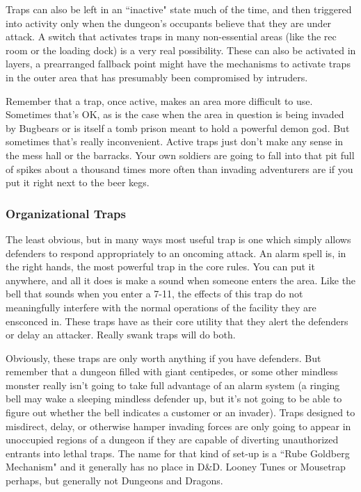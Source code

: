 Traps can also be left in an ``inactive" state much of the time, and then triggered into activity only when the dungeon's occupants believe that they are under attack. A switch that activates traps in many non-essential areas (like the rec room or the loading dock) is a very real possibility. These can also be activated in layers, a prearranged fallback point might have the mechanisms to activate traps in the outer area that has presumably been compromised by intruders.

Remember that a trap, once active, makes an area more difficult to use. Sometimes that's OK, as is the case when the area in question is being invaded by Bugbears or is itself a tomb prison meant to hold a powerful demon god. But sometimes that's really inconvenient. Active traps just don't make any sense in the mess hall or the barracks. Your own soldiers are going to fall into that pit full of spikes about a thousand times more often than invading adventurers are if you put it right next to the beer kegs.

\subsubsection{Organizational Traps}

The least obvious, but in many ways most useful trap is one which simply allows defenders to respond appropriately to an oncoming attack. An alarm spell is, in the right hands, the most powerful trap in the core rules. You can put it anywhere, and all it does is make a sound when someone enters the area. Like the bell that sounds when you enter a 7-11, the effects of this trap do not meaningfully interfere with the normal operations of the facility they are ensconced in. These traps have as their core utility that they alert the defenders or delay an attacker. Really swank traps will do both.

Obviously, these traps are only worth anything if you have defenders. But remember that a dungeon filled with giant centipedes, or some other mindless monster really isn't going to take full advantage of an alarm system (a ringing bell may wake a sleeping mindless defender up, but it's not going to be able to figure out whether the bell indicates a customer or an invader). Traps designed to misdirect, delay, or otherwise hamper invading forces are only going to appear in unoccupied regions of a dungeon if they are capable of diverting unauthorized entrants into lethal traps. The name for that kind of set-up is a ``Rube Goldberg Mechanism" and it generally has no place in D\&D. Looney Tunes or Mousetrap perhaps, but generally not Dungeons and Dragons.

